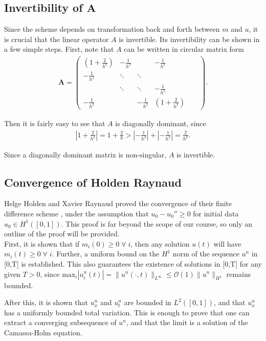 \subsection*{Invertibility of $\bm{A}$}
Since the scheme depends on transformation back and forth between $m$ and $u$, it is crucial that the linear operator $A$ is invertible. Its invertibility can be shown in a few simple steps. First, note that $A$ can be written in circular matrix form
\begin{align*}
\bm{A} = 
\begin{pmatrix}
  (1 + \frac{2}{h^2}) & -\frac{1}{h^2} &  & -\frac{1}{h^2} \\
  -\frac{1}{h^2} & \ddots & \ddots  &  & &   \\
  & \ddots & \ddots & -\frac{1}{h^2}\\
  -\frac{1}{h^2} & & -\frac{1}{h^2} & (1 + \frac{2}{h^2})
 \end{pmatrix}.
\end{align*}

Then it is fairly easy to see that $A$ is diagonally dominant, since
\begin{align*}
|1 + \frac{2}{h^2}| = 1 + \frac{2}{h}> |-\frac{1}{h^2}| + |-\frac{1}{h^2}| = \frac{2}{h^2}.
\end{align*}

Since a diagonally dominant matrix is non-singular, $A$ is invertible.

\subsection*{Convergence of Holden Raynaud}
Helge Holden and Xavier Raynaud proved the convergence of their finite difference scheme \cite{holden2006convergence}, under the assumption that $u_{0} - u_{0}'' \geq 0$ for initial data $u_{0} \in H^{1}([0,1])$. This proof is far beyond the scope of our course, so only an outline of the proof will be provided. \\

First, it is shown that if $m_{i}(0) \geq 0 \; \forall \;i$, then any solution $u(t)$ will have $m_{i}(t) \geq 0 \; \forall \;i $. Further, a uniform bound on the $H^{1}$ norm of the sequence $u^{n}$ in [0,T] is established. This also guarantees the existence of solutions in [0,T] for any given $T > 0$, since $\text{max}_{i}|u_{i}^{n}(t)| = \|u^{n}(\cdot,t)\|_{L^{\infty}} \leq \mathcal{O}(1) \|u^{n}\|_{H^{1}}$ remains bounded.

After this, it is shown that $u_{x}^{n}$ and $u_{t}^{n}$ are bounded in $L^{2}([0,1])$, and that $u_{x}^{n}$ has a uniformly bounded total variation. This is enough to prove that one can extract a converging subsequence of $u^{n}$, and that the limit is a solution of the Camassa-Holm equation. 


